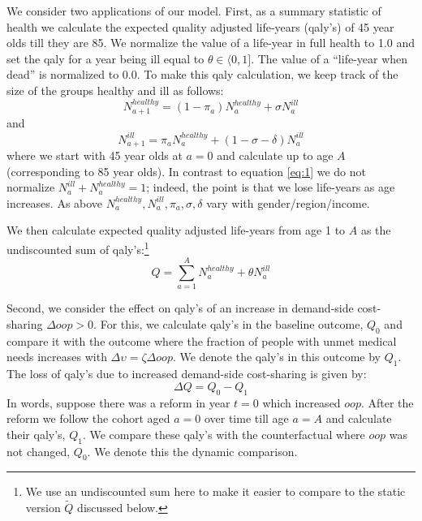 \documentclass[a4paper,12pt]{article}
\begin{document}
We consider two applications of our model. First, as a summary statistic of health we calculate the expected quality adjusted life-years (qaly's) of 45 year olds till they are 85. We normalize the value of a life-year in full health to 1.0 and set the qaly for a year being ill equal to \(\theta \in \langle 0, 1]\). The value of a ``life-year when dead'' is normalized to 0.0. To make this qaly calculation, we keep track of the size of the groups healthy and ill as follows:
\begin{equation}
\label{eq:6}
N^{healthy}_{a+1} = (1-\pi_a) N^{healthy}_a + \sigma N^{ill}_{a}
\end{equation}
and
\begin{equation}
\label{eq:7}
N^{ill}_{a+1} = \pi_a N^{healthy}_{a} + (1-\sigma-\delta) N^{ill}_{a}
\end{equation}
where we start with 45 year olds at \(a=0\) and calculate up to age \(A\) (corresponding to 85 year olds). In contrast to equation \eqref{eq:1} we do not normalize \(N^{ill}_a + N^{healthy}_a = 1\); indeed, the point is that we lose life-years as age increases. As above \(N^{healthy}_{a},N^{ill}_{a},\pi_a,\sigma,\delta\) vary with gender/region/income.

We then calculate expected quality adjusted life-years from age 1 to \(A\) as the undiscounted sum of qaly's:\footnote{We use an undiscounted sum here to make it easier to compare to the static version \(\tilde Q\) discussed below.}
\begin{equation}
\label{eq:8}
Q = \sum_{a=1}^{A} N^{healthy}_a + \theta N^{ill}_{a}
\end{equation}

Second, we consider the effect on qaly's of an increase in demand-side cost-sharing \(\Delta oop > 0\). For this, we calculate qaly's in the baseline outcome, \(Q_0\) and compare it with the outcome where the fraction of people with unmet medical needs increases with \(\Delta \upsilon = \zeta \Delta oop\). We denote the qaly's in this outcome by \(Q_1\). The loss of qaly's  due to increased demand-side cost-sharing is given by:
\begin{equation}
\label{eq:9}
\Delta Q = Q_0 - Q_1
\end{equation}
In words, suppose there was a reform in year \(t=0\) which increased \(oop\). After the reform we follow the cohort aged \(a=0\) over time till age \(a=A\) and calculate their qaly's, \(Q_1\). We compare these qaly's with the counterfactual where \(oop\) was not changed, \(Q_0\). We denote this the dynamic comparison.
\end{document}

